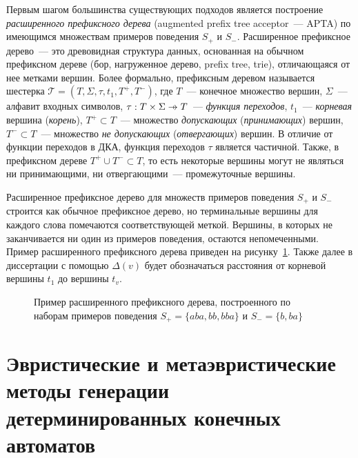 Первым шагом большинства существующих подходов является построение \emph{расширенного префиксного дерева} (augmented prefix tree acceptor~{---} APTA) по имеющимся множествам примеров поведения $S_{+}$ и $S_{-}$. 
Расширенное префиксное дерево~--- это древовидная структура данных, основанная на обычном префиксном дереве (бор, нагруженное дерево, prefix tree, trie), отличающаяся от нее метками вершин.
Более формально, префиксным деревом называется шестерка $\mathcal{T} = \left(T,\Sigma,\tau,t_{1},T^{+}, T^{-}\right)$, где $T$~{---} конечное множество вершин, $\Sigma$~{---} алфавит входных символов, $\tau: T \times \Sigma \pto T$~{---} \emph{функция переходов}, $t_{1}$~{---} \emph{корневая} вершина (\emph{корень}), $T^{+} \subset T$~{---} множество \emph{допускающих} (\emph{принимающих}) вершин, $T^{-} \subset T$~{---} множество \emph{не допускающих} (\emph{отвергающих}) вершин.
В отличие от функции переходов в ДКА, функция переходов $\tau$ является частичной. 
Также, в префиксном дереве $T^{+} \cup T^{-} \subset T$, то есть некоторые вершины могут не являться ни принимающими, ни отвергающими~--- промежуточные вершины.

Расширенное префиксное дерево для множеств примеров поведения $S_{+}$ и $S_{-}$ строится как обычное префиксное дерево, но терминальные вершины для каждого слова помечаются соответствующей меткой. Вершины, в которых не заканчивается ни один из примеров поведения, остаются непомеченными. Пример расширенного префиксного дерева приведен на рисунку~\ref{img:apta-ex}.
Также далее в диссертации с помощью $\Delta(v)$ будет обозначаться расстояния от корневой вершины $t_{1}$ до вершины $t_{v}$.

\begin{figure}[ht]
  \centering
  \ifafour
    
  \else
    
  \fi
  \caption{Пример расширенного префиксного дерева, построенного по наборам примеров поведения $S_{+} = \{aba, bb, bba\}$ и $S_{-} = \{b, ba\}$}
  \label{img:apta-ex}
\end{figure}


\section{Эвристические и метаэвристические методы генерации детерминированных конечных автоматов} 
\label{sec:review:heuristic-dfa-inf}


